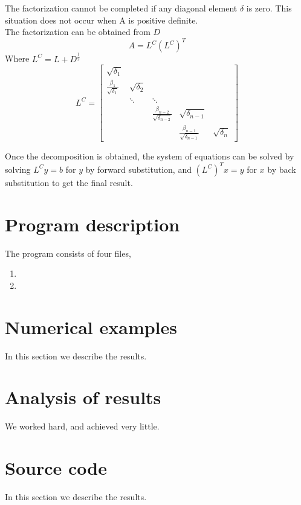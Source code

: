 \documentclass[12pt]{article}
\begin{document}
The factorization cannot be completed if any diagonal element $\delta$ is zero. This situation does not occur when A is positive definite.\\

The factorization can be obtained from $D$
$$
A = L^C(L^C)^T
$$
Where $L^C=L+D^{\frac{1}{2}}$
$$
L^C = \left[
\begin{array}{ccccc}
\sqrt{\delta_1} &  &  & & \\
\frac{\beta_1}{\sqrt{\delta_1}} & \sqrt{\delta_2} &   & & \\
  &\ddots&\ddots& &  \\
 &  & \frac{\beta_{n-2}}{\sqrt{\delta_{n-2}}} & \sqrt{\delta_{n-1}} &  \\
  &  &   & \frac{\beta_{n-1}}{\sqrt{\delta_{n-1}}} & \sqrt{\delta_n}
\end{array}
\right]
$$

Once the decomposition is obtained, the system of equations can be solved by solving $L^Cy=b$ for $y$ by forward substitution, and $(L^C)^Tx=y$ for $x$ by back substitution to get the final result.                  


\section{Program description}
The program consists of four files,
\begin{enumerate}
\item 
\item
\end{enumerate}


\section{Numerical examples}
In this section we describe the results.

\section{Analysis of results}
We worked hard, and achieved very little.

\section{Source code}
In this section we describe the results.


\end{document}
